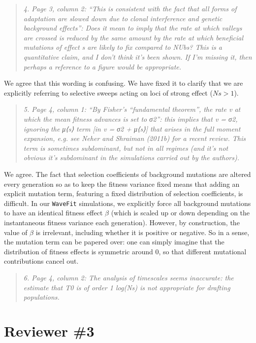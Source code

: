 \documentclass[11pt]{article}
\newenvironment{reviewerquote}{\begin{quote}\color{black}\itshape}{\end{quote}}
\begin{document}
\begin{reviewerquote}
4. Page 3, column 2: “This is consistent with the fact that all forms of adaptation are slowed down due to clonal interference and genetic background effects”: Does it mean to imply that the rate at which valleys are crossed is reduced by the same amount by the rate at which beneficial mutations of effect s are likely to fix compared to NUbs? This is a quantitative claim, and I don’t think it’s been shown. If I’m missing it, then perhaps a reference to a figure would be appropriate.
\end{reviewerquote}

We agree that this wording is confusing. We have fixed it to clarify that we are explicitly referring to selective sweeps acting on loci of strong effect ($Ns > 1$).

\begin{reviewerquote}
5. Page 4, column 1: “By Fisher’s “fundamental theorem”, the rate v at which the mean fitness advances is set to σ2”: this implies that v = σ2, ignoring the μ⟨s⟩ term [in v = σ2 + μ⟨s⟩] that arises in the full moment expansion, e.g. see Neher and Shraiman (2011b) for a recent review. This term is sometimes subdominant, but not in all regimes (and it’s not obvious it’s subdominant in the simulations carried out by the authors).
\end{reviewerquote}

We agree. The fact that selection coefficients of background mutations are altered every generation so as to keep the fitness variance fixed means that adding an explicit mutation term, featuring a fixed distribution of selection coefficients, is difficult. In our \texttt{WaveFit} simulations, we explicitly force all background mutations to have an identical fitness effect $\beta$ (which is scaled up or down depending on the instantaneous fitness variance each generation). However, by construction, the value of $\beta$ is irrelevant, including whether it is positive or negative. So in a sense, the mutation term can be papered over: one can simply imagine that the distribution of fitness effects is symmetric around 0, so that different mutational contributions cancel out.

\begin{reviewerquote}
6. Page 4, column 2: The analysis of timescales seems inaccurate: the estimate that T0 is of order 1 log(Ns) is not appropriate for drafting populations.
\end{reviewerquote}


\section*{Reviewer \#3}
\end{document}
